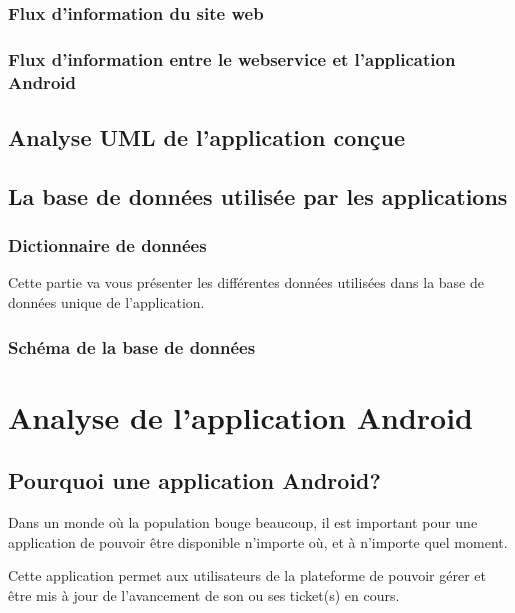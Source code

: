 \documentclass[12pt,table,a4paper]{report}
\begin{document}
\subsubsection{Flux d'information du site web}

\subsubsection{Flux d'information entre le webservice et l'application Android}

\subsection{Analyse UML de l'application conçue}

\subsection{La base de données utilisée par les applications}

\subsubsection{Dictionnaire de données}
Cette partie va vous présenter les différentes données utilisées dans la base de données unique de l'application.

\subsubsection{Schéma de la base de données}

\section{Analyse de l'application Android}

\subsection{Pourquoi une application Android?}
Dans un monde où la population bouge beaucoup, il est important pour une application de pouvoir être disponible n'importe où, et à n'importe quel moment.

Cette application permet aux utilisateurs de la plateforme de pouvoir gérer et être mis à jour de l'avancement de son ou ses ticket(s) en cours.
\end{document}
